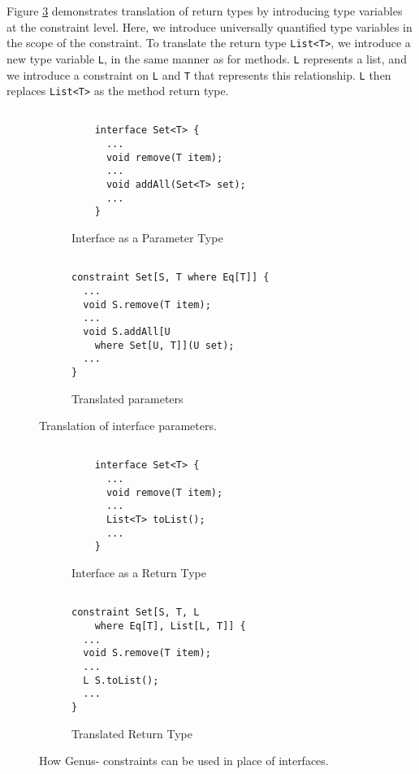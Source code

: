 Figure \ref{fig:interface-return} demonstrates translation of return types by introducing type variables at the constraint level. Here, we introduce universally quantified type variables in the scope of the constraint. To translate the return type \texttt{List<T>}, we introduce a new type variable \texttt{L}, in the same manner as for methods. \texttt{L} represents a list, and we introduce a constraint on \texttt{L} and \texttt{T} that represents this relationship. \texttt{L} then replaces \texttt{List<T>} as the method return type. \\

\begin{figure}[h]
    \centering
    \begin{subfigure}[t]{0.45\textwidth}
        \centering
        \begin{verbatim}
        
    interface Set<T> {
      ...
      void remove(T item);
      ...
      void addAll(Set<T> set);
      ...
    }
        \end{verbatim}
        \caption{Interface as a Parameter Type}
    \end{subfigure}
    \hfill
    \begin{subfigure}[t]{0.45\textwidth}
        \centering
        \begin{verbatim}
        
constraint Set[S, T where Eq[T]] {
  ...
  void S.remove(T item);
  ...
  void S.addAll[U 
    where Set[U, T]](U set);
  ...
}
        \end{verbatim}
        \caption{Translated parameters}
    \end{subfigure}
    \caption{Translation of interface parameters.}
    \label{fig:interface-parameters}
\end{figure}

\begin{figure}[h]
    \centering
    \begin{subfigure}[t]{0.45\textwidth}
        \centering
        \begin{verbatim}
        
    interface Set<T> {
      ...
      void remove(T item);
      ...
      List<T> toList();
      ...
    }
        \end{verbatim}
        \caption{Interface as a Return Type}
    \end{subfigure}
    \hfill
    \begin{subfigure}[t]{0.45\textwidth}
        \centering
        \begin{verbatim}
        
constraint Set[S, T, L 
    where Eq[T], List[L, T]] {
  ...
  void S.remove(T item);
  ...
  L S.toList();
  ...
}
        \end{verbatim}
        \caption{Translated Return Type}
    \label{fig:genus-set2}
    \end{subfigure}
    \caption{How Genus- constraints can be used in place of interfaces.}
    \label{fig:interface-return}
\end{figure}

